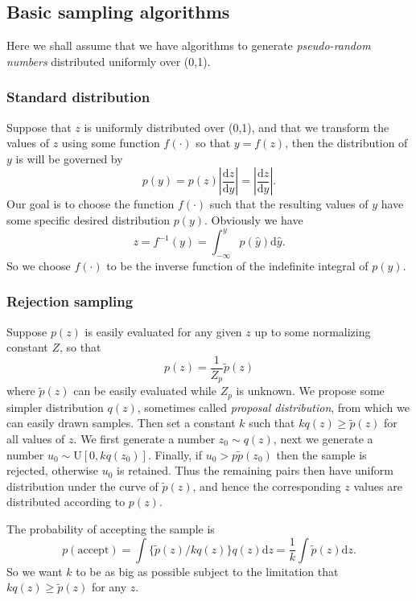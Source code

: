 \documentclass[a4paper]{book}
\newcommand{\mrm}{\mathrm}
\newcommand{\ud}{\mathrm{d}}
\newcommand{\tit}{\textit}
\begin{document}
\subsection{Basic sampling algorithms}
Here we shall assume that we have algorithms to generate \tit{pseudo-random numbers} distributed uniformly over (0,1).
\subsubsection*{Standard distribution}
Suppose that $z$ is uniformly distributed over (0,1), and that we transform the values of $z$ using some function $f(\cdot)$ so that $y=f(z)$, then the distribution of $y$ is will be governed by
\begin{equation}\label{}
  p(y)=p(z)|\frac{\ud z}{\ud y}| = |\frac{\ud z}{\ud y}|.
\end{equation}
Our goal is to choose the function $f(\cdot)$ such that the resulting values of $y$ have some specific desired distribution $p(y)$. Obviously we have
\begin{equation}\label{}
  z=f^{-1}(y)=\int_{-\infty}^{y}p(\hat y)\ud \hat y.
\end{equation}
So we choose $f(\cdot)$ to be the inverse function of the indefinite integral of $p(y)$.

\subsubsection*{Rejection sampling}
Suppose $p(z)$ is easily evaluated for any given $z$ up to some normalizing constant $Z$, so that
\begin{equation}\label{}
  p(z)=\frac1{Z_p}\tilde{p}(z)
\end{equation}
where $\tilde{p}(z)$ can be easily evaluated while $Z_p$ is unknown. We propose some simpler distribution $q(z)$, sometimes called \tit{proposal distribution}, from which we can easily drawn samples. Then set a constant $k$ such that $kq(z)\geq \tilde{p}(z)$ for all values of $z$. We first generate a number $z_0\sim q(z)$, next we generate a number $u_0 \sim \mrm U[0,kq(z_0)]$. Finally, if $u_0>p\tilde p(z_0)$ then the sample is rejected, otherwise $u_0$ is retained.  Thus the remaining pairs then have uniform distribution under the curve of $\tilde p(z)$, and hence the corresponding $z$ values are distributed according to $p(z)$.

The probability of accepting the sample is
\begin{equation}\label{}
  p(\mrm{accept})=\int \{\tilde p(z)/kq(z)\}q(z)\ud z=\frac1k\int \tilde p(z)\ud z.
\end{equation}
So we want $k$ to be as big as possible subject to the limitation that $kq(z)\geq \tilde p(z)$ for any $z$.
\end{document}
